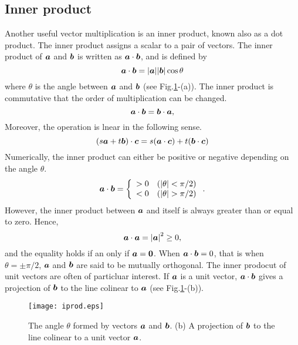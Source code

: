 \documentclass[10pt,a4j]{article}
\begin{document}
\subsection{Inner product} 
Another useful vector multiplication is an inner product, known also as a dot product. The inner product assigns a scalar to a pair of vectors. The inner product of $\mbox{\boldmath $a$}$ and $\mbox{\boldmath $b$}$ is written as $\mbox{\boldmath $a$}\cdot\mbox{\boldmath $b$}$, 
and is defined by 
\begin{equation}
    \mbox{\boldmath $a$}\cdot\mbox{\boldmath $b$}=|\mbox{\boldmath $a$}||\mbox{\boldmath $b$}|\cos\theta
    \label{eqn:idot_def}
\end{equation}
where $\theta$ is the angle between $\mbox{\boldmath $a$}$ and $\mbox{\boldmath $b$}$ (see Fig.\ref{fig:fig1_5}-(a)). The inner product is commutative that the order of multiplication can be changed.
\begin{equation}
    \mbox{\boldmath $a$}\cdot\mbox{\boldmath $b$}
    =
    \mbox{\boldmath $b$}\cdot\mbox{\boldmath $a$}, 
    \label{eqn:}
\end{equation}
Moreover, the operation is lnear in the following sense.
\begin{equation}
    \left(s\mbox{\boldmath $a$}+t\mbox{\boldmath $b$}\right)\cdot\mbox{\boldmath $c$}
    =
    s(\mbox{\boldmath $a$}\cdot\mbox{\boldmath $c$})+t(\mbox{\boldmath $b$}\cdot \mbox{\boldmath $c$})
    \label{eqn:}
\end{equation}
Numerically, the inner product can either be positive or negative depending on the angle $\theta$.
\begin{equation}
    \mbox{\boldmath $a$}\cdot\mbox{\boldmath $b$}
    =
    \left\{
    \begin{array}{cc}
        >0 & ( |\theta|< \pi/2) \\
        <0 & ( |\theta| > \pi/2)
    \end{array}
    \right.
    .
    \label{eqn:}
\end{equation}
However, the inner product between $\mbox{\boldmath $a$}$ and itself is always greater than or equal to zero. Hence, 
\begin{equation}
    \mbox{\boldmath $a$}\cdot \mbox{\boldmath $a$}=\left| \mbox{\boldmath $a$} \right|^2 \geq 0, 
    \label{eqn:a_dot_a}
\end{equation}
 and the equality holds if an only if $\mbox{\boldmath $a$}=\mbox{\boldmath $0$}$. When $\mbox{\boldmath $a$}\cdot\mbox{\boldmath $b$}=0$, that is when $\theta=\pm \pi/2$, $\mbox{\boldmath $a$}$ and $\mbox{\boldmath $b$}$ are said to be mutually orthogonal. The inner prodocut of unit vectors are often of particluar interest. If $\mbox{\boldmath $a$}$ is a unit vector, $\mbox{\boldmath $a$}\cdot\mbox{\boldmath $b$}$ gives a projection 
of $\mbox{\boldmath $b$}$ to the line colinear to $\mbox{\boldmath $a$}$ (see Fig.\ref{fig:fig1_5}-(b)). 
\begin{figure}[h]
    \begin{center}
    \texttt{[image: iprod.eps]} 
    \end{center}
    \caption{The angle $\theta$ formed by vectors $\mbox{\boldmath $a$}$ and $\mbox{\boldmath $b$}$. 
    (b) A projection of $\mbox{\boldmath $b$}$ to the line colinear to a unit vector $\mbox{\boldmath $a$}$.} 
    \label{fig:fig1_5}
\end{figure}
%
\end{document}
